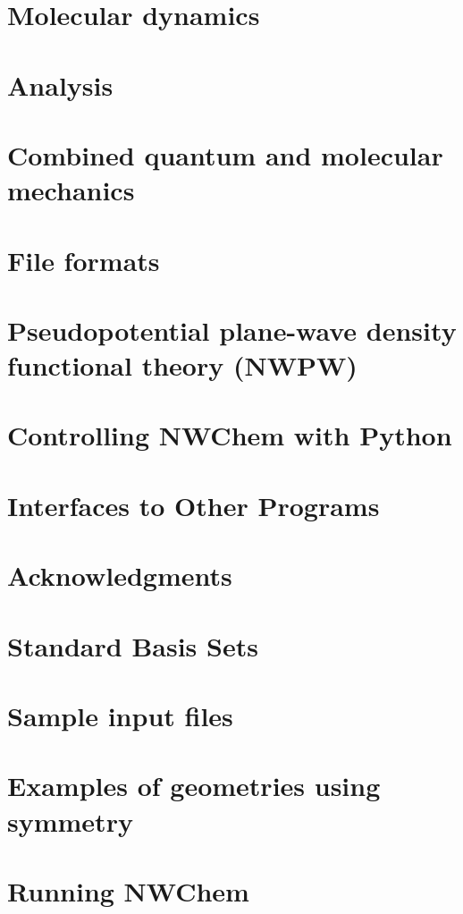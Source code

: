 \chapter{Molecular dynamics}


\chapter{Analysis}


\chapter{Combined quantum and molecular mechanics}


\chapter{File formats}


\chapter{Pseudopotential plane-wave density functional theory (NWPW)}


\chapter{Controlling NWChem with Python}


\chapter{Interfaces to Other Programs}


\clearpage
\chapter{Acknowledgments}

\clearpage

\appendix

\chapter{Standard Basis Sets}


\chapter{Sample input files}


\chapter{Examples of geometries using symmetry}


\chapter{Running NWChem}


